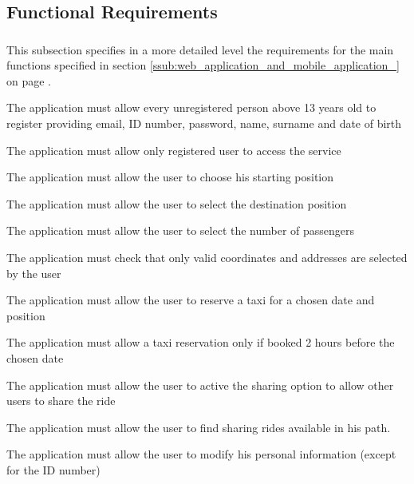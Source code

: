 
\subsection{Functional Requirements} %
\label{sec:functionalrequirement}
\subsubsection{}
This subsection specifies in a more detailed level the requirements for the main functions specified in section \ref{ssub:web_application_and_mobile_application_} on page \pageref{ssub:web_application_and_mobile_application_}.
\begin{enumerate}[label = \textbf{[FR\arabic*]}]
	\item The application must allow every unregistered person above 13 years old to register providing email, ID number, password, name, surname and date of birth
	\item The application must allow only registered user to access the service
	\item The application must allow the user to choose his starting position
	\item The application must allow the user to select the destination position
	\item The application must allow the user to select the number of passengers
	\item The application must check that only valid coordinates and addresses  are selected by the user
	\item The application must allow the user to reserve a taxi for a chosen  date and position
	\item The application must allow a taxi reservation only if booked 2 hours before the chosen date
	\item The application must allow the user to active the sharing option to allow other users to share the ride
	\item The application must allow the user to find sharing rides available in his path.
	\item The application must allow the user to modify his personal information (except for the ID number) 
\end{enumerate}


